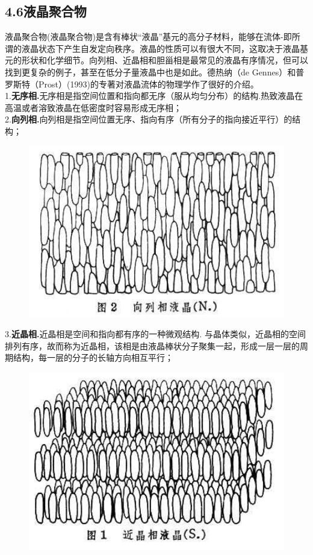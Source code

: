 \subsection{4.6液晶聚合物}

液晶聚合物(液晶聚合物)是含有棒状“液晶”基元的高分子材料，能够在流体-即所谓的液晶状态下产生自发定向秩序。液晶的性质可以有很大不同，这取决于液晶基元的形状和化学细节。向列相、近晶相和胆甾相是最常见的液晶有序情况，但可以找到更复杂的例子，甚至在低分子量液晶中也是如此。德热纳（de Gennes）和普罗斯特（Prost）(1993)的专著对液晶流体的物理学作了很好的介绍。\\

1.\textbf{无序相.}无序相是指空间位置和指向都无序（服从均匀分布）的结构.热致液晶在高温或者溶致液晶在低密度时容易形成无序相；\\
2.\textbf{向列相.}向列相是指空间位置无序、指向有序（所有分子的指向接近平行）的结构；\\
\begin{figure}[H]
	\centering   
	\includegraphics[width=12cm]{./figures/4.png}
\end{figure}
3.\textbf{近晶相.}近晶相是空间和指向都有序的一种微观结构. 与晶体类似，近晶相的空间排列有序，故而称为近晶相，该相是由液晶棒状分子聚集一起，形成一层一层的周期结构，每一层的分子的长轴方向相互平行；\\
\begin{figure}[H]
	\centering   
	\includegraphics[width=12cm]{./figures/3.png}
\end{figure}
